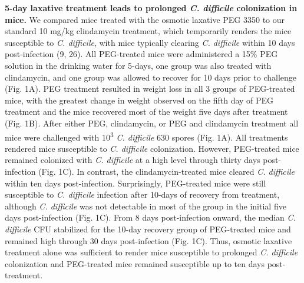 \documentclass[
  11pt,
]{article}
\begin{document}
\textbf{5-day laxative treatment leads to prolonged \emph{C. difficile}
colonization in mice.} We compared mice treated with the osmotic
laxative PEG 3350 to our standard 10 mg/kg clindamycin treatment, which
temporarily renders the mice susceptible to \emph{C. difficile}, with
mice typically clearing \emph{C. difficile} within 10 days
post-infection (9, 26). All PEG-treated mice were administered a 15\%
PEG solution in the drinking water for 5-days, one group was also
treated with clindamycin, and one group was allowed to recover for 10
days prior to challenge (Fig. 1A). PEG treatment resulted in weight loss
in all 3 groups of PEG-treated mice, with the greatest change in weight
observed on the fifth day of PEG treatment and the mice recovered most
of the weight five days after treatment (Fig. 1B). After either PEG,
clindamycin, or PEG and clindamycin treatment all mice were challenged
with 10\textsuperscript{3} \emph{C. difficile} 630 spores (Fig. 1A). All
treatments rendered mice susceptible to \emph{C. difficile}
colonization. However, PEG-treated mice remained colonized with \emph{C.
difficile} at a high level through thirty days post-infection (Fig. 1C).
In contrast, the clindamycin-treated mice cleared \emph{C. difficile}
within ten days post-infection. Surprisingly, PEG-treated mice were
still susceptible to \emph{C. difficile} infection after 10-days of
recovery from treatment, although \emph{C. difficile} was not detectable
in most of the group in the initial five days post-infection (Fig. 1C).
From 8 days post-infection onward, the median \emph{C. difficile} CFU
stabilized for the 10-day recovery group of PEG-treated mice and
remained high through 30 days post-infection (Fig. 1C). Thus, osmotic
laxative treatment alone was sufficient to render mice susceptible to
prolonged \emph{C. difficile} colonization and PEG-treated mice remained
susceptible up to ten days post-treatment.
\end{document}
